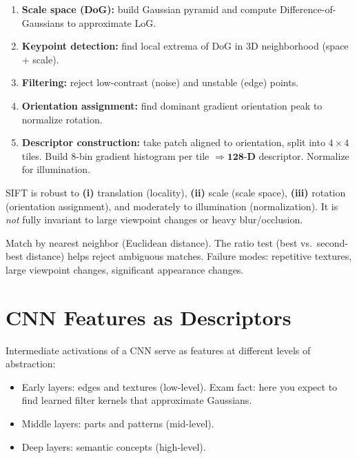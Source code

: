 \documentclass[11pt, oneside]{book}
\begin{document}
\begin{thmbox}[title={Reprojection Error Minimization}]
\begin{defbox}[title={Correlation and Convolution}]
\begin{defbox}[title={ReLU and Pooling}]
\begin{enumerate}
  \item \textbf{Scale space (DoG):} build Gaussian pyramid and compute Difference-of-Gaussians to approximate LoG.
  \item \textbf{Keypoint detection:} find local extrema of DoG in 3D neighborhood (space + scale).
  \item \textbf{Filtering:} reject low-contrast (noise) and unstable (edge) points.
  \item \textbf{Orientation assignment:} find dominant gradient orientation peak to normalize rotation.
  \item \textbf{Descriptor construction:} take patch aligned to orientation, split into $4\times4$ tiles. Build 8-bin gradient histogram per tile $\Rightarrow \mathbf{128\text{-D}}$ descriptor. Normalize for illumination.
\end{enumerate}

\begin{notebox}[title={SIFT Invariances and Limitations}]
SIFT is robust to \textbf{(i)} translation (locality), \textbf{(ii)} scale (scale space),
\textbf{(iii)} rotation (orientation assignment), and moderately to illumination (normalization).
It is \emph{not} fully invariant to large viewpoint changes or heavy blur/occlusion.
\end{notebox}

Match by nearest neighbor (Euclidean distance). The ratio test (best vs.\ second-best distance)
helps reject ambiguous matches. Failure modes: repetitive textures, large viewpoint changes, significant appearance changes.

\section{CNN Features as Descriptors}

Intermediate activations of a CNN serve as features at different levels of abstraction:
\begin{itemize}
  \item Early layers: edges and textures (low-level). Exam fact: here you expect to find learned filter kernels that approximate Gaussians.
  \item Middle layers: parts and patterns (mid-level).
  \item Deep layers: semantic concepts (high-level).
\end{itemize}


\end{defbox}
\end{defbox}
\end{thmbox}
\end{document}

